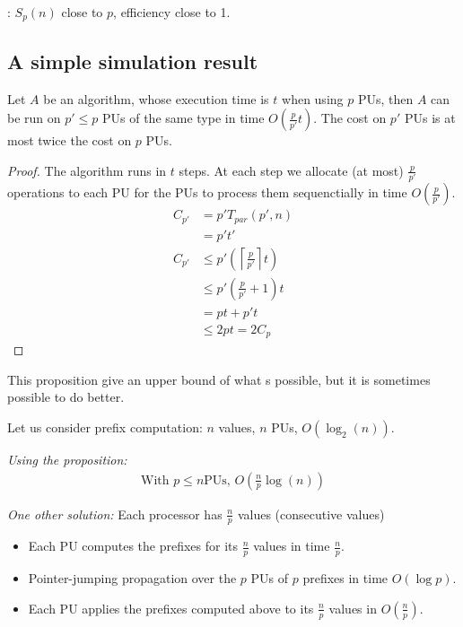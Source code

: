 : $S_p(n)$ close to $p$, efficiency close to 1.

\subsection{A simple simulation result}
\begin{prop}
Let $A$ be an algorithm, whose execution time is $t$ when using $p$ PUs, then $A$ can be run on $p'\leq p$ PUs of the same type in time $O(\frac{p}{p'}t)$. The cost on $p'$ PUs is at most twice the cost on $p$ PUs.
\end{prop}

\begin{proof}
The algorithm runs in $t$ steps. At each step we allocate (at most) $\frac{p}{p'}$ operations to each PU for the PUs to process them sequenctially in time $O(\frac{p}{p'})$.
\begin{align*}
C_{p'} & = p'T_{par}(p',n)\\
& = p' t'\\
C_{p'} & \leq p' \left( \left\lceil \frac{p}{p'}\right\rceil t \right) \\
& \leq p'\left( \frac{p}{p'}+1 \right) t\\
& = pt + p't\\
& \leq 2pt=2C_p
\end{align*}
\end{proof}

 This proposition give an upper bound of what s possible, but it is sometimes possible to do better.

Let us consider prefix computation: $n$ values, $n$ PUs, $O(\log_2 (n))$.

\textit{Using the proposition:}
\begin{align*}
\text{With }p\leq n \text{PUs, } O\left(\frac{n}{p}\log(n)\right)
\end{align*}

\textit{One other solution:}
Each processor has $\frac{n}{p}$ values (consecutive values)
\begin{itemize}
\item Each PU computes the prefixes for its $\frac{n}{p}$ values in time $\frac{n}{p}$.
\item Pointer-jumping propagation over the $p$ PUs of $p$ prefixes in time $O(\log p)$.
\item Each PU applies the prefixes computed above to its $\frac{n}{p}$ values in $O(\frac{n}{p})$.
\end{itemize}

